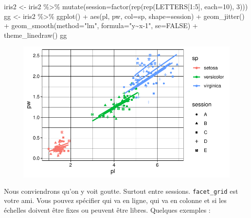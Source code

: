 \documentclass[
  letterpaper,
  DIV=11,
  numbers=noendperiod]{scrreprt}
\newenvironment{Shaded}{\begin{snugshade}}{\end{snugshade}}
\newcommand{\AttributeTok}[1]{\textcolor[rgb]{0.40,0.45,0.13}{#1}}
\newcommand{\ConstantTok}[1]{\textcolor[rgb]{0.56,0.35,0.01}{#1}}
\newcommand{\DecValTok}[1]{\textcolor[rgb]{0.68,0.00,0.00}{#1}}
\newcommand{\FunctionTok}[1]{\textcolor[rgb]{0.28,0.35,0.67}{#1}}
\newcommand{\NormalTok}[1]{\textcolor[rgb]{0.00,0.23,0.31}{#1}}
\newcommand{\OtherTok}[1]{\textcolor[rgb]{0.00,0.23,0.31}{#1}}
\newcommand{\SpecialCharTok}[1]{\textcolor[rgb]{0.37,0.37,0.37}{#1}}
\newcommand{\StringTok}[1]{\textcolor[rgb]{0.13,0.47,0.30}{#1}}
\begin{document}
\begin{Shaded}
\begin{Highlighting}[]
\NormalTok{iris2 }\OtherTok{\textless{}{-}}\NormalTok{ iris2 }\SpecialCharTok{\%\textgreater{}\%} \FunctionTok{mutate}\NormalTok{(}\AttributeTok{session=}\FunctionTok{factor}\NormalTok{(}\FunctionTok{rep}\NormalTok{(}\FunctionTok{rep}\NormalTok{(LETTERS[}\DecValTok{1}\SpecialCharTok{:}\DecValTok{5}\NormalTok{], }\AttributeTok{each=}\DecValTok{10}\NormalTok{), }\DecValTok{3}\NormalTok{)))}
\NormalTok{gg }\OtherTok{\textless{}{-}}\NormalTok{ iris2 }\SpecialCharTok{\%\textgreater{}\%} \FunctionTok{ggplot}\NormalTok{() }\SpecialCharTok{+} 
  \FunctionTok{aes}\NormalTok{(pl, pw, }\AttributeTok{col=}\NormalTok{sp, }\AttributeTok{shape=}\NormalTok{session) }\SpecialCharTok{+} 
  \FunctionTok{geom\_jitter}\NormalTok{() }\SpecialCharTok{+} \FunctionTok{geom\_smooth}\NormalTok{(}\AttributeTok{method=}\StringTok{"lm"}\NormalTok{, }\AttributeTok{formula=}\StringTok{"y\textasciitilde{}x{-}1"}\NormalTok{, }\AttributeTok{se=}\ConstantTok{FALSE}\NormalTok{) }\SpecialCharTok{+}
  \FunctionTok{theme\_linedraw}\NormalTok{()}
\NormalTok{gg}
\end{Highlighting}
\end{Shaded}

\begin{figure}[H]

{\centering \includegraphics{ggplot2_files/figure-pdf/unnamed-chunk-26-1.pdf}

}

\end{figure}

Nous conviendrons qu'on y voit goutte. Surtout entre sessions.
\texttt{facet\_grid} est votre ami. Vous pouvez spécifier qui va en
ligne, qui va en colonne et si les échelles doivent être fixes ou
peuvent être libres. Quelques exemples :
\end{document}
